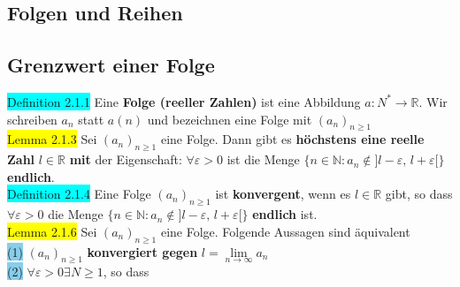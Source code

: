 \documentclass[landscape, 10pt]{article}
\newcommand{\R}{\mathbb{R}}
\newcommand{\N}{\mathbb{N}}
\begin{document}
\begin{multicols}{3}
\section{Folgen und Reihen}
       \subsection{Grenzwert einer Folge}
              \colorbox{cyan}{Definition 2.1.1} 
                     Eine \textbf{Folge (reeller Zahlen)} ist 
                     eine Abbildung $a:N^{*}\longrightarrow\R$. 
                     Wir schreiben $a_n$ statt $a(n)$ und 
                     bezeichnen eine Folge mit 
                     \textcolor{NavyBlue}{$(a_n)_{n\geqslant 1}$}\\
              \colorbox{yellow}{Lemma 2.1.3} 
                     Sei $(a_n)_{n\geqslant 1}$ eine 
                     Folge. Dann gibt es \textbf{höchstens eine reelle Zahl} 
                     \textcolor{NavyBlue}{$l\in\R$} 
                     \textbf{mit} der Eigenschaft: 
                     \textcolor{NavyBlue}{$\forall\varepsilon >0$} ist die Menge 
                     \textcolor{NavyBlue}{
                     $\{n\in\N:a_n\notin ]l-\varepsilon,\,l+\varepsilon[\}$} 
                     \textbf{endlich}.\\
              \colorbox{cyan}{Definition 2.1.4} 
                     Eine Folge $(a_n)_{n\geqslant 1}$ ist 
                     \textbf{konvergent}, wenn es \textcolor{NavyBlue}{$l\in\R$} 
                     gibt, so dass 
                     \textcolor{NavyBlue}{$\forall\varepsilon >0$} die Menge 
                     \textcolor{NavyBlue}{
                     $\{n\in\N:a_n\notin ]l-\varepsilon,\, l+\varepsilon[\}$} 
                     \textbf{endlich} ist.\\
              \colorbox{yellow}{Lemma 2.1.6} 
                     Sei $(a_n)_{n\geqslant 1}$ eine Folge. 
                     Folgende Aussagen sind äquivalent\\
                     \colorbox{SkyBlue}{(1)} 
                            \textcolor{NavyBlue}{$(a_n)_{n\geqslant 1}$} 
                            \textbf{konvergiert gegen} 
                            \textcolor{NavyBlue}{$l=\lim\limits_{n\to\infty}a_n$}\\
                     \quad\colorbox{SkyBlue}{(2)} 
                            \textcolor{NavyBlue}{
                            $\forall\varepsilon >0\exists N\geqslant 1$}, 
                            so dass \textcolor{
                            NavyBlue}{
}
\end{multicols}
\end{document}
